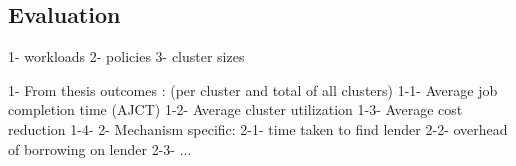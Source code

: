 \subsection{Evaluation}

1- workloads %
2- policies 
3- cluster sizes

1- From thesis outcomes : (per cluster and total of all clusters)
    1-1- Average job completion time (AJCT)
    1-2- Average cluster utilization
    1-3- Average cost reduction
    1-4- 
2- Mechanism specific: 
   2-1- time taken to find lender
   2-2- overhead of borrowing on lender
   2-3- ... 
